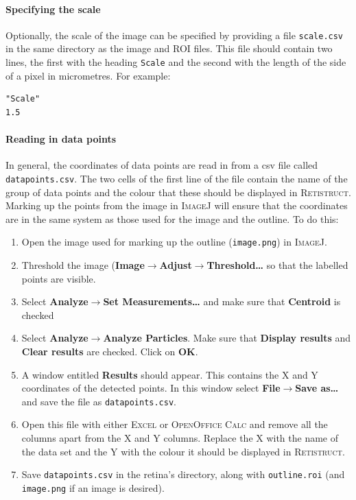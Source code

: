 \documentclass{article}
\begin{document}
\paragraph{Specifying the scale} Optionally, the scale of the image
can be specified by providing a file \texttt{scale.csv} in the same
directory as the image and ROI files. This file should contain two
lines, the first with the heading \texttt{Scale} and the second with
the length of the side of a pixel in micrometres. For example:
\begin{verbatim}
"Scale"
1.5
\end{verbatim}

\paragraph{Reading in data points}
\label{retistruct-user-guide:sec:read-data-points}

In general, the coordinates of data points are read in from a csv file
called \texttt{datapoints.csv}. The two cells of the first line of the
file contain the name of the group of data points and the colour that
these should be displayed in \textsc{Retistruct}.  Marking up the
points from the image in \textsc{ImageJ} will ensure that the
coordinates are in the same system as those used for the image and the
outline. To do this:
\begin{enumerate}
\item Open the image used for marking up the outline
  (\texttt{image.png}) in \textsc{ImageJ}.
\item Threshold the image
  (\textbf{Image$\rightarrow$Adjust$\rightarrow$Threshold\dots} so
  that the labelled points are visible.
\item Select \textbf{Analyze$\rightarrow$Set Measurements\dots} and make
  sure that \textbf{Centroid} is checked
\item Select \textbf{Analyze$\rightarrow$Analyze Particles}. Make sure
  that \textbf{Display results} and \textbf{Clear results} are
  checked. Click on \textbf{OK}.
\item A window entitled \textbf{Results} should appear. This contains
  the X and Y coordinates of the detected points. In this window
  select \textbf{File$\rightarrow$Save as\dots} and save the file as
  \texttt{datapoints.csv}.
\item Open this file with either \textsc{Excel} or \textsc{OpenOffice
    Calc} and remove all the columns apart from the X and Y
  columns. Replace the X with the name of the data set and the Y with
  the colour it should be displayed in \textsc{Retistruct}.
\item Save \texttt{datapoints.csv} in the retina's directory, along
  with \texttt{outline.roi} (and \texttt{image.png} if an image is
  desired).
\end{enumerate}
\end{document}
